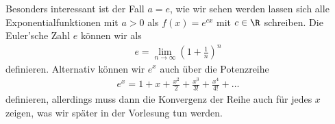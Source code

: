 \documentclass[letterpaper,10pt,english]{jupyterBook}
\begin{document}
Besonders interessant ist  der Fall \(a=e\), wie wir sehen werden lassen sich alle Exponentialfunktionen mit \(a > 0\) als \(f(x) = e^{cx}\) mit \(c\in \R\) schreiben. Die Euler’sche Zahl \(e\) können wir als
\begin{equation*}
\begin{split} e= \lim_{n \rightarrow \infty} \left(1 + \frac{1}n\right)^n \end{split}
\end{equation*}
definieren. Alternativ können wir \(e^x\) auch über die Potenzreihe
\begin{equation*}
\begin{split} e^{x} = 1 + x+ \frac{x^2}2 + \frac{x^3}{3!} + \frac{x^4}{4!} + \ldots \end{split}
\end{equation*}
definieren, allerdings muss dann die Konvergenz der Reihe auch für jedes \(x\) zeigen, was wir später in der Vorlesung tun werden.
\end{document}
